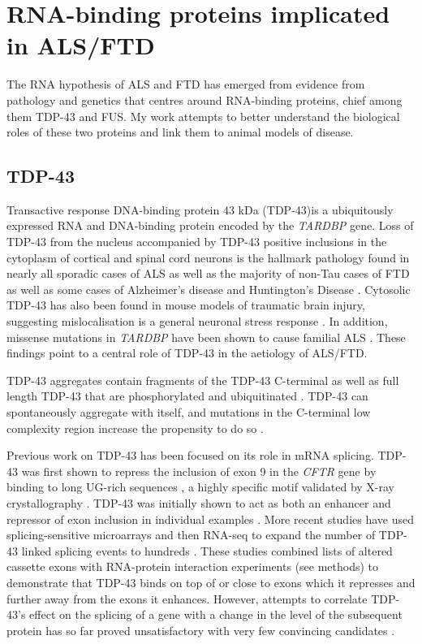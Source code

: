 \section{RNA-binding proteins implicated in ALS/FTD}

The RNA hypothesis of ALS and FTD has emerged from evidence from pathology and genetics that centres around RNA-binding proteins, chief among them TDP-43 and FUS.
My work attempts to better understand the biological roles of these two proteins and link them to animal models of disease.

\subsection{TDP-43}
Transactive response DNA-binding protein 43 kDa (TDP-43)is a ubiquitously expressed RNA and DNA-binding protein encoded by the \emph{TARDBP} gene. 
Loss of TDP-43 from the nucleus accompanied by TDP-43 positive inclusions in the cytoplasm of cortical and spinal cord neurons is the hallmark pathology found in nearly all sporadic cases of ALS as well as the majority of non-Tau cases of FTD \citep{Neumann2006-re,Arai2006} as well as some cases of Alzheimer's disease \citep{LaClair2016} and Huntington's Disease \citep{Doi2008}. 
Cytosolic TDP-43 has also been found in mouse models of traumatic brain injury, suggesting mislocalisation is a general neuronal stress response \citep{Moisse2009}. 
In addition, missense mutations in \emph{TARDBP} have been shown to cause familial ALS \citep{Sreedharan2008-xv}. 
These findings point to a central role of TDP-43 in the aetiology of ALS/FTD. 


TDP-43 aggregates contain fragments of the TDP-43 C-terminal as well as full length TDP-43 that are phosphorylated and ubiquitinated \citep{Neumann2006,Arai2006, Bosque2013, Hasegawa2008}.
TDP-43 can spontaneously aggregate with itself, and mutations in the C-terminal low complexity region increase the propensity to do so \citep{Johnson2009}.

Previous work on TDP-43 has been focused on its role in mRNA splicing. TDP-43 was first shown to repress the inclusion of exon 9 in the \emph{CFTR} gene by binding to long UG-rich sequences \citep{Buratti2001a, Buratti2001}, a highly specific motif validated by X-ray crystallography \citep{Lukavsky2013}. 
TDP-43 was initially shown to act as both an enhancer and repressor of exon inclusion in individual examples \citep{Mercado2005-js,Bose2008-du,Shiga2012-it}. 
More recent studies have used splicing-sensitive microarrays and then RNA-seq to expand the number of TDP-43 linked splicing events to hundreds  \citep{Polymenidou2011,Tollervey2011,Kapeli2016}. 
These studies combined lists of altered cassette exons with RNA-protein interaction experiments (see methods) to demonstrate that TDP-43 binds on top of or close to exons which it represses and further away from the exons it enhances. 
However, attempts to correlate TDP-43's effect on the splicing of a gene with a change in the level of the subsequent protein has so far proved unsatisfactory with very few convincing candidates \citep{DeConti2015,Stalekar2015}.

